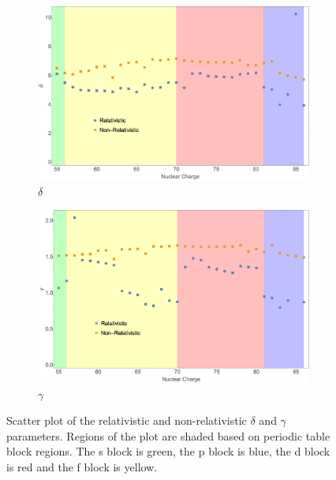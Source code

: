 \begin{figure}
\centering
\begin{subfigure}[b]{0.49\textwidth}
	\includegraphics[width=\textwidth]{Figures/BS_rel_delta.png}
	\caption{$\delta$}
\end{subfigure}
\begin{subfigure}[b]{0.49\textwidth}
	\includegraphics[width=\textwidth]{Figures/BS_rel_gamma.png}
	\caption{$\gamma$}
\end{subfigure}	
\caption[Scatter plot of the relativistic and non-relativistic $\delta$ and $\gamma$ parameters.]{Scatter plot of the relativistic and non-relativistic $\delta$ and $\gamma$ parameters. Regions of the plot are shaded based on periodic table block regions. The s block is green, the p block is blue, the d block is red and the f block is yellow.}
\label{fig:BS_rel_delt_gamm}
\end{figure}

